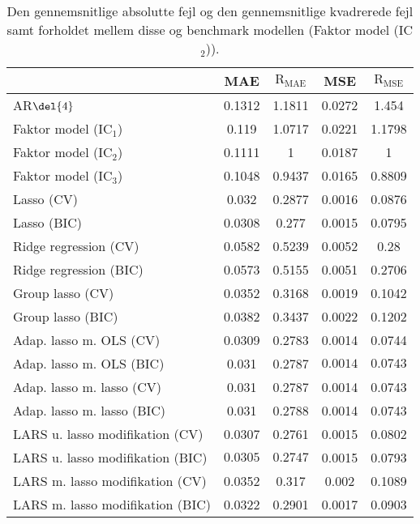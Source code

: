\begin{table}[ht]
\center
\begin{tabular}{lcccc}
\toprule
 & MAE & \(\text{R}_{\text{MAE}}\) & MSE & \(\text{R}_{\text{MSE}}\) \\ \midrule
AR\(\del{4}\) & 0.1312 & 1.1811 & 0.0272 & 1.454 \\  
Faktor model (IC\(_1\)) & 0.119 & 1.0717 & 0.0221 & 1.1798 \\
Faktor model (IC\(_2\)) & 0.1111 & 1 & 0.0187 & 1 \\
Faktor model (IC\(_3\)) & 0.1048 & 0.9437 & 0.0165 & 0.8809 \\
Lasso (CV) & 0.032 & 0.2877 & 0.0016 & 0.0876 \\
Lasso (BIC) & 0.0308 & 0.277 & 0.0015 & 0.0795 \\
Ridge regression (CV) & 0.0582 & 0.5239 & 0.0052 & 0.28 \\
Ridge regression (BIC) & 0.0573 & 0.5155 & 0.0051 & 0.2706 \\
Group lasso (CV) & 0.0352 & 0.3168 & 0.0019 & 0.1042  \\
Group lasso (BIC) & 0.0382 & 0.3437 & 0.0022 & 0.1202 \\
Adap. lasso m. OLS (CV) & 0.0309 & 0.2783 & 0.0014 & 0.0744 \\
Adap. lasso m. OLS (BIC) & 0.031 & 0.2787 & $\mathbf{0.0014}$ & $\mathbf{0.0743}$ \\
Adap. lasso m. lasso (CV) & 0.031 & 0.2787 & 0.0014 & 0.0743 \\
Adap. lasso m. lasso (BIC) & 0.031 & 0.2788 & 0.0014 & 0.0743 \\
LARS u. lasso modifikation (CV) &  0.0307 & 0.2761 & 0.0015 & 0.0802 \\
LARS u. lasso modifikation (BIC) & $\mathbf{0.0305}$ & $\mathbf{0.2747}$ & 0.0015 & 0.0793 \\
LARS m. lasso modifikation (CV) &  0.0352 & 0.317 & 0.002 & 0.1089 \\
LARS m. lasso modifikation (BIC) & 0.0322 & 0.2901 & 0.0017 & 0.0903 \\ \bottomrule
\end{tabular}
\caption{Den gennemsnitlige absolutte fejl og den gennemsnitlige kvadrerede fejl samt forholdet mellem disse og benchmark modellen (Faktor model (IC\(_2\))).} \label{tab:mae_mse_vurdering}
\end{table}
